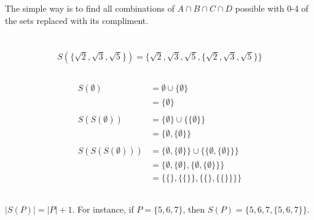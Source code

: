 \documentclass{article}
\begin{document}
\subsection{}
The simple way is to find all combinations of $A \cap B \cap C \cap D$ possible with 0-4 of the sets replaced with its compliment.

\section{}
\subsection{}
\begin{equation*}
    S(\{ \sqrt{2}, \sqrt{3}, \sqrt{5} \}) = 
    \{ \sqrt{2}, \sqrt{3}, \sqrt{5} , \{ \sqrt{2}, \sqrt{3}, \sqrt{5} \} \}
\end{equation*}

\subsection{}

\begin{align*}
    S(\emptyset ) & = \emptyset \cup \{ \emptyset \} \\
    & = \{ \emptyset \} \\ \\
    S(S(\emptyset)) &= \{ \emptyset \} \cup \{ \{ \emptyset \} \} \\
    &= \{ \emptyset, \{ \emptyset \} \} \\ \\
    S(S(S(\emptyset))) & = \{ \emptyset, \{ \emptyset \} \}  \cup \{ \{ \emptyset, \{ \emptyset \} \} \} \\
    & = \{ \emptyset , \{ \emptyset \} , \{ \emptyset , \{ \emptyset \} \} \} \\
    & = \{ \{ \} , \{ \{ \} \} , \{ \{ \} , \{ \{ \} \} \} \}
\end{align*}

\subsection{} 
$|S(P)| = |P| +1$. For instance, if $P = \{ 5, 6, 7 \}$, then $S(P) = \{ 5, 6, 7, \{ 5, 6, 7 \} \}$. 
\end{document}
